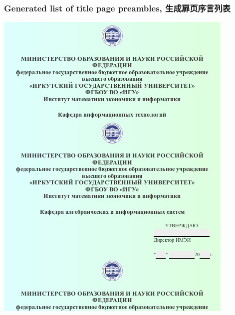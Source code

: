 \documentclass[10pt]{beamer}
\begin{document}
\begin{frame}
  \frametitle{Generated list of title page preambles, 生成扉页序言列表}
    \begin{adjustwidth}{-2.5em}{-2.5em}
    \begin{center}
      \includegraphics[width=0.7\linewidth]{template-title-pages.jpg}
    \end{center}
  \end{adjustwidth}
\end{frame}
\end{document}
